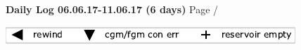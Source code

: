 \noindent \large{\textbf{Daily Log 06.06.17-11.06.17 (6 days)}} \hfill \small{Page \thepage/\pageref{LastPage}}

\vspace{0.5em}
\centerline{\includegraphics{legendSymbols.pdf}}
\vspace{0.1em}